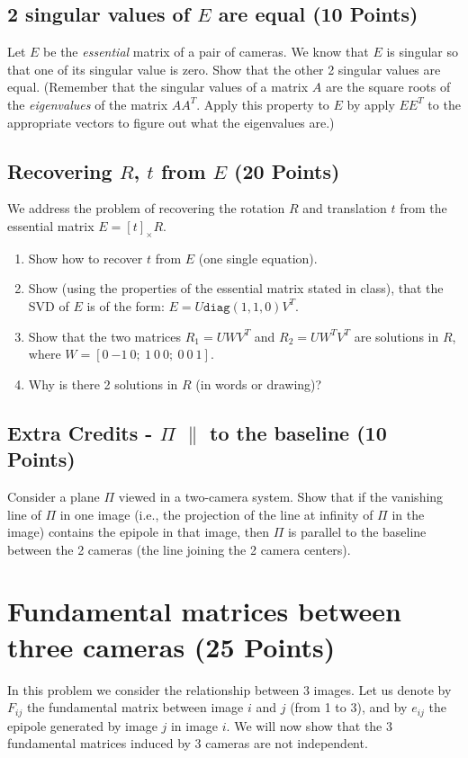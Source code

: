 \documentclass[11pt]{article}
\begin{document}
\subsection{2 singular values of $E$ are equal (10 Points)}

Let $E$ be the {\em essential} matrix of a pair of cameras. We know that $E$ is singular so that one of its singular value is zero. 
Show that the other 2 singular values are equal. (Remember that the singular values of a matrix $A$ are the square roots of the {\em eigenvalues}
of the matrix $AA^T$. Apply this property to $E$ by apply $EE^T$ to the appropriate vectors to figure out what the eigenvalues are.)

\subsection{Recovering $R$, $t$ from $E$ (20 Points)}
We address the problem of recovering the rotation $R$ and translation $t$ from
the essential matrix $E = [t]_\times R$.
\begin{enumerate}
\item Show how to recover $t$ from $E$ (one single equation).
\item Show (using the properties of the essential matrix stated in class), that
the SVD of $E$ is of the form: $E = U\texttt{diag}(1,1,0)V^T$.
\item Show that the two matrices $R_1 = UWV^T$ and $R_2 = UW^TV^T$ are
solutions in $R$, where $W = [0\ {-1}\ 0;\ 1\ 0\ 0;\ 0\ 0\ 1]$.
\item Why is there 2 solutions in $R$ (in words or drawing)?
\end{enumerate}

\subsection{Extra Credits - $\Pi$ $\|$ to the baseline (10 Points) }
Consider a plane $\Pi$ viewed in a two-camera system. Show that if the vanishing line of $\Pi$ in one image (i.e., the projection of the line at infinity of $\Pi$ in the image) contains the epipole in that image, then $\Pi$ is parallel to the baseline between the 2 cameras (the line joining the 2 camera centers).



\section{Fundamental matrices between three cameras (25 Points)}
In this problem we consider the relationship between $3$ images. Let us denote by $F_{ij}$ the fundamental matrix between image $i$ and $j$ (from 1 to 3), and by $e_{ij}$ the epipole generated by image $j$ in image $i$. We will now show that the $3$ fundamental matrices induced by $3$ cameras are not independent. 
\end{document}
